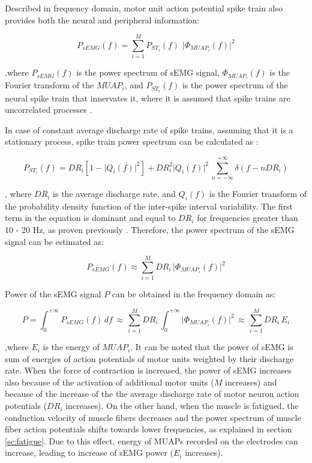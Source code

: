 Described in frequency domain, motor unit action potential spike train also provides both the neural and peripheral information:

\begin{equation}
P_{sEMG}(f) = \sum_{i=1}^{M} P_{ST_i}(f) \, \, \big\vert \Phi_{MUAP_i}(f) \big\vert^2
\end{equation}

,where $P_{sEMG}(f)$ is the power spectrum of sEMG signal, $\Phi_{MUAP_i}(f)$ is the Fourier transform of the $MUAP_i$, and $P_{ST_i}(f)$ is the power spectrum of the neural spike train that innervates it, where it is assumed that spike trains are uncorrelated processes \citep{Farina2014}.

In case of constant average discharge rate of spike trains, assuming that it is a stationary process, spike train power spectrum can be calculated as \citep{Farina}:

\begin{equation}
P_{ST_i}(f) = DR_i \left[ 1- \big\vert Q_i(f)\big\vert^2 \right] + DR_i^2  \big\vert Q_i(f)\big\vert^2 \,  \sum_{n=-\infty}^{+\infty} \delta(f - n DR_i)
\end{equation}

, where $DR_i$ is the average discharge rate, and $Q_i(f)$ is the Fourier transform of the probability density function of the inter-spike interval variability. The first term in the equation is dominant and equal to $DR_i$ for frequencies greater than 10 - 20 Hz, as proven previously \citep{Lago1977, Farina2014}. Therefore, the power spectrum of the sEMG signal can be estimated as:

\begin{equation}
P_{sEMG}(f) \approx  \sum_{i=1}^{M} DR_i \, \big\vert \Phi_{MUAP_i}(f) \big\vert^2
\end{equation}

Power of the sEMG signal $P$ can be obtained in the frequency domain as:

\begin{equation}
P = \int_0^{+\infty} P_{sEMG}(f)  \, df  \, \approx \, \sum_{i=1}^{M} DR_i \, \int_0^{+\infty} \big\vert \Phi_{MUAP_i}(f) \big\vert^2 \, \approx \, \sum_{i=1}^{M} DR_i \,E_i
\end{equation}

,where $E_i$ is the energy of $MUAP_i$. It can be noted that the power of sEMG is sum of energies of action potentials of motor units weighted by their discharge rate. When the force of contraction is increased, the power of sEMG increases also because of the activation of additional motor units ($M$ increases) and because of the increase of the the average discharge rate of motor neuron action potentials ($DR_i$ increases). On the other hand, when the muscle is fatigued, the conduction velocity of muscle fibers decreases and the power spectrum of muscle fiber action potentials shifts towards lower frequencies, as explained in section \ref{sc:fatigue}. Due to this effect, energy of MUAPs recorded on the electrodes can increase, leading to increase of sEMG power ($E_i$ increases).

